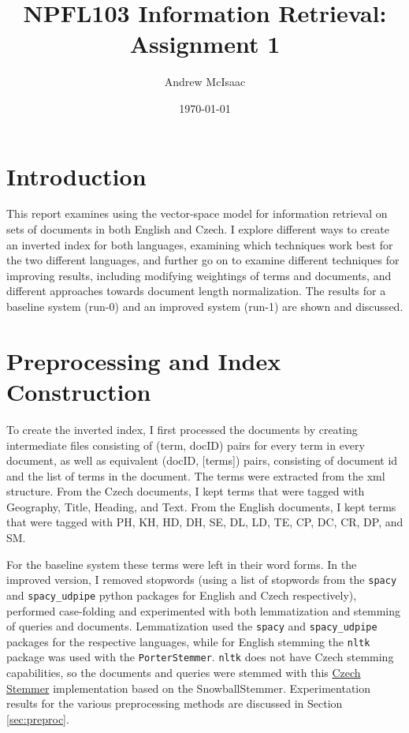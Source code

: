 \documentclass[a4paper]{article}
\title{NPFL103 Information Retrieval: Assignment 1}
\date{\today}
\author{Andrew McIsaac}
\begin{document}
\maketitle

\section{Introduction}
This report examines using the vector-space model for information retrieval on
sets of documents in both English and Czech. I explore different ways to create
an inverted index for both languages, examining which techniques work best for
the two different languages, and further go on to examine different techniques
for improving results, including modifying weightings of terms and documents,
and different approaches towards document length normalization. The results
for a baseline system (run-0) and an improved system (run-1) are shown and
discussed.

\section{Preprocessing and Index Construction}
To create the inverted index, I first processed the documents by creating
intermediate files consisting of (term, docID) pairs for every term in every
document, as well as equivalent (docID, [terms]) pairs, consisting of document
id and the list of terms in the document. The terms were extracted from the xml
structure. From the Czech documents, I kept terms that were tagged with
Geography, Title, Heading, and Text. From the English documents, I kept terms
that were tagged with PH, KH, HD, DH, SE, DL, LD, TE, CP, DC, CR, DP, and SM.

For the baseline system these terms were left in their word forms. In the
improved version, I removed stopwords (using a list of stopwords from the
\texttt{spacy} and \texttt{spacy\_udpipe} python packages for English and Czech
respectively), performed case-folding and experimented with both lemmatization
and stemming of queries and documents. Lemmatization used the \texttt{spacy} and
\texttt{spacy\_udpipe} packages for the respective languages, while for English
stemming the \texttt{nltk} package was used with the \texttt{PorterStemmer}.
\texttt{nltk} does not have Czech stemming capabilities, so the documents and
queries were stemmed with this 
\href{https://github.com/UFAL-DSG/alex/blob/master/alex/utils/czech_stemmer.py}
{Czech Stemmer} implementation based on the SnowballStemmer. Experimentation
results for the various preprocessing methods are discussed in Section
\ref{sec:preproc}.
\end{document}
